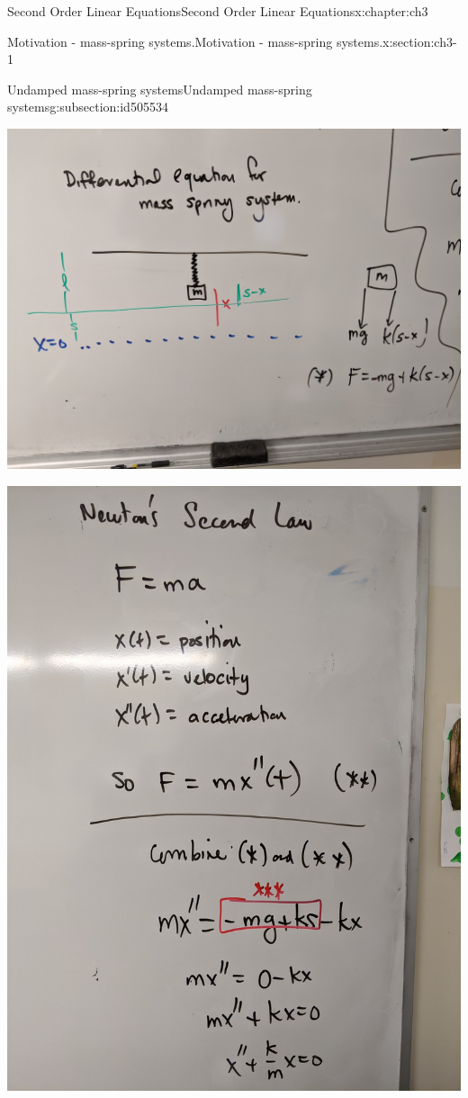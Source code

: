 \documentclass[oneside,10pt,]{book}
\numberwithin{equation}{section}
\numberwithin{equation}{section}
\begin{document}
\begin{chapterptx}{Second Order Linear Equations}{}{Second Order Linear Equations}{}{}{x:chapter:ch3}
\begin{sectionptx}{Motivation - mass-spring systems.}{}{Motivation - mass-spring systems.}{}{}{x:section:ch3-1}
\begin{subsectionptx}{Undamped mass-spring systems}{}{Undamped mass-spring systems}{}{}{g:subsection:id505534}
\begin{image}{0}{1}{0}
\includegraphics[width=\linewidth]{images/spring_diff_1.jpg}
\end{image}%
\begin{image}{0}{1}{0}%
\includegraphics[width=\linewidth]{images/spring_diff_2.jpg}

\end{image}
\end{subsectionptx}
\end{sectionptx}
\end{chapterptx}
\end{document}
